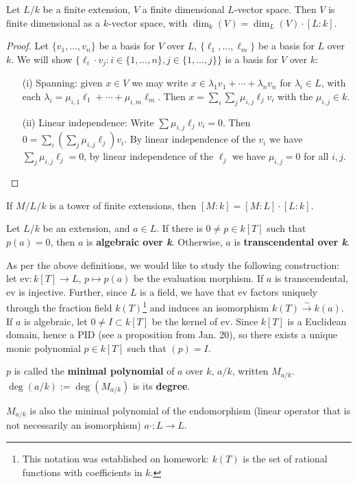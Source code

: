 \begin{prop} \label{Prop 7, Jan 27}
Let $L/k$ be a finite extension, $V$ a finite dimensional $L$-vector space. Then $V$ is finite dimensional as a $k$-vector space, with $\dim_k(V) = \dim_L(V) \cdot [L : k]$.
\end{prop}
\begin{proof}
Let $\{v_1, ..., v_n\}$ be a basis for $V$ over $L$, $\{\ell_1, ..., \ell_m\}$ be a basis for $L$ over $k$. We will show $\{\ell_i \cdot v_j \colon i \in \{1, ..., n\}, j \in \{1, ..., j\}\}$ is a basis for $V$ over $k$:
\begin{enumerate}
\item[(i)] Spanning: given $x \in V$ we may write $x \in \lambda_1v_1 + \cdots + \lambda_nv_n$ for $\lambda_i \in L$, with each $\lambda_i = \mu_{i,1}\ell_1 + \cdots + \mu_{i,m}\ell_m$. Then $x = \sum_i \sum_j \mu_{i, j} \ell_j v_i$ with the $\mu_{i,j} \in k$.
\item[(ii)] Linear independence: Write $\sum \mu_{i,j} \ell_j v_i = 0$. Then $0 = \sum_i \left( \sum_j\mu_{i,j} \ell_j \right) v_i$. By linear independence of the $v_i$ we have $\sum_j\mu_{i,j} \ell_j = 0$, by linear independence of the $\ell_j$ we have $\mu_{i,j} = 0$ for all $i,j$.
\end{enumerate}
\end{proof}

\begin{cor}\label{Cor 8, Jan 27}
If $M/L/k$ is a tower of finite extensions, then $[M : k] = [M : L] \cdot [L : k]$.
\end{cor}

\begin{defn} \label{Defn 9, Jan 27}
Let $L/k$ be an extension, and $a \in L$. If there is $0 \neq p \in k[T]$ such that $p(a) = 0$, then $a$ is \textbf{algebraic over \textit{k}}. Otherwise, $a$ is \textbf{transcendental over \textit{k}}.
\end{defn}

As per the above definitions, we would like to study the following construction: let $\text{ev} \colon k[T] \rightarrow L$, $p \mapsto p(a)$ be the evaluation morphism. If $a$ is transcendental, ev is injective. Further, since $L$ is a field, we have that ev factors uniquely through the fraction field $k(T)$\footnote{This notation was established on homework: $k(T)$ is the set of rational functions with coefficients in $k$.} and induces an isomorphism $k(T) \stackrel{\sim}{\rightarrow} k(a)$. If $a$ is algebraic, let $0 \neq I \subset k[T]$ be the kernel of ev. Since $k[T]$ is a Euclidean domain, hence a PID (see a proposition from Jan. 20), so there exists a unique monic polynomial $p \in k[T]$ such that $(p) = I$.

\begin{defn} \label{Defn 10, Jan 27}
$p$ is called the \textbf{minimal polynomial} of $a$ over $k$, $a/k$, written $M_{a/k}$. $\deg(a/k) := \deg(M_{a/k})$ is its \textbf{degree}.
\end{defn}

\begin{rmk}
$M_{a/k}$ is also the minimal polynomial of the endomorphism (linear operator that is not necessarily an isomorphism) $a \cdot \colon L \rightarrow L$.
\end{rmk}
